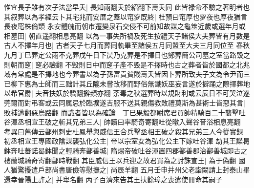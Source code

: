 惟宜長子雖有次子法當早夭|{
	長知兩翻夭於紹翻下壽夭同}
此皆禄命不驗之著明者也其叙葬以為孝經云卜其宅兆而安厝之蓋以窀穸既終|{
	杜預曰窀厚也穸夜也厚夜猶言長夜窀株倫類}
永安體魄而朝市遷變泉石交侵不可前知故謀之龜筮近歲或選年月或相墓田|{
	朝直遥翻相息亮翻}
以為一事失所禍及死生按禮天子諸侯大夫葬皆有月數是古人不擇年月也|{
	古者天子七月而葬同軌畢至諸侯五月同盟至大夫三月同位至}
春秋九月丁巳葬定公雨不克葬戊午日下昃乃克葬是不擇日也鄭葬簡公司墓之室當路毁之則朝而窆|{
	窆必驗翻}
不毁則日中而窆子產不毁是不擇時也古之葬者皆於國都之北兆域有常處是不擇地也今葬書以為子孫富貴貧賤壽夭皆因卜葬所致夫子文為令尹而三已柳下惠為士師而三黜計其丘隴未嘗改移而野俗無識妖巫妄言遂於擗踊之際擇葬地以希官爵|{
	夫音扶妖於驕翻擗頻亦翻}
荼毒之秋選葬時以規財利或云辰日不可哭泣遂莞爾而對弔客或云同属忌於臨壙遂吉服不送其親傷教敗禮莫斯為甚術士皆惡其言|{
	敗補邁翻惡烏路翻}
而識者皆以為確論　丁巳果毅都尉席君買帥精騎百二十襲擊吐谷渾丞相宣王破之斬其兄弟三人|{
	帥讀曰率騎奇寄翻吐從暾入聲谷音浴相息亮翻　考異曰舊傳云鄯州刺史杜鳳舉與威信王合兵擊丞相王破之殺其兄弟三人今從實録}
初丞相宣王專國政隂謀襲弘化公主|{
	帝以宗室女為弘化公主下嫁吐谷渾}
劫其王諾曷鉢奔吐蕃諾曷鉢聞之輕騎奔鄯善城|{
	隋焬帝破吐谷渾置四郡鄯善郡治鄯善城即古之樓蘭城騎奇寄翻鄯時戰翻}
其臣威信王以兵迎之故君買為之討誅宣王|{
	為于偽翻}
國人猶驚擾遣戶部尚書唐儉等慰撫之|{
	尚辰羊翻}
五月壬申并州父老詣闕請上封泰山畢還幸晉陽上許之|{
	并卑名翻}
丙子百濟來告其王扶餘璋之喪遣使冊命其嗣子

